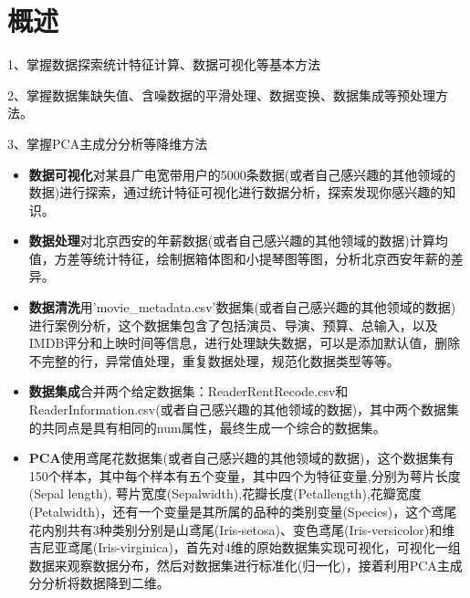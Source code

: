 \documentclass[a4paper]{article}
\begin{document}


\section{概述} \label{overview}%

1、掌握数据探索统计特征计算、数据可视化等基本方法

2、掌握数据集缺失值、含噪数据的平滑处理、数据变换、数据集成等预处理方法。

3、掌握PCA主成分分析等降维方法

\begin{itemize}
	\item{\textbf{数据可视化}对某县广电宽带用户的5000条数据(或者自己感兴趣的其他领域的数据)进行探索，通过统计特征可视化进行数据分析，探索发现你感兴趣的知识。}
    \item{\textbf{数据处理}对北京西安的年薪数据(或者自己感兴趣的其他领域的数据)计算均值，方差等统计特征，绘制据箱体图和小提琴图等图，分析北京西安年薪的差异。}
    \item{\textbf{数据清洗}用'movie\_metadata.csv'数据集(或者自己感兴趣的其他领域的数据)进行案例分析，这个数据集包含了包括演员、导演、预算、总输入，以及IMDB评分和上映时间等信息，进行处理缺失数据，可以是添加默认值，删除不完整的行，异常值处理，重复数据处理，规范化数据类型等等。
    }
    \item{\textbf{数据集成}合并两个给定数据集：ReaderRentRecode.csv和ReaderInformation.csv(或者自己感兴趣的其他领域的数据)，其中两个数据集的共同点是具有相同的num属性，最终生成一个综合的数据集。
    }
    \item{\textbf{PCA}使用鸢尾花数据集(或者自己感兴趣的其他领域的数据)，这个数据集有150个样本，其中每个样本有五个变量，其中四个为特征变量,分别为萼片长度(Sepal length), 萼片宽度(Sepalwidth),花瓣长度(Petallength),花瓣宽度(Petalwidth)，还有一个变量是其所属的品种的类别变量(Species)，这个鸢尾花内别共有3种类别分别是山鸢尾(Iris-setosa)、变色鸢尾(Iris-versicolor)和维吉尼亚鸢尾(Iris-virginica)，首先对4维的原始数据集实现可视化，可视化一组数据来观察数据分布，然后对数据集进行标准化(归一化)，接着利用PCA主成分分析将数据降到二维。}
\end{itemize}

\end{document}
